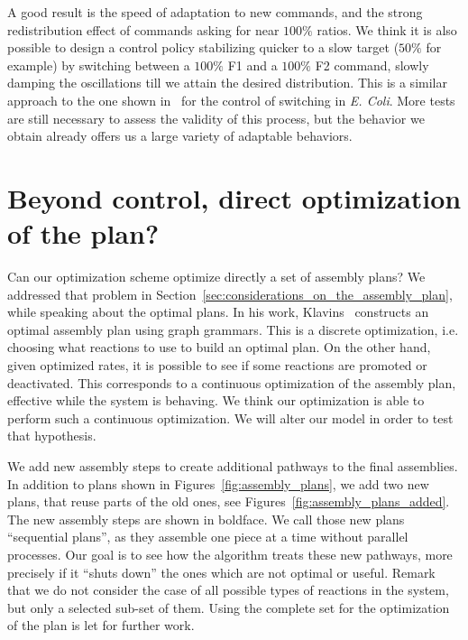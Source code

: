 	A good result is the speed of adaptation to new commands, and the strong redistribution effect of commands asking for near $100\%$ ratios. We think it is also possible to design a control policy stabilizing quicker to a slow target ($50\%$ for example) by switching between a $100\%$ F1 and a $100\%$ F2 command, slowly damping the oscillations till we attain the desired distribution. This is a similar approach to the one shown in~\cite{Julius:2007p4774, Julius:2008p4775} for the control of switching in \textit{E. Coli}. More tests are still necessary to assess the validity of this process, but the behavior we obtain already offers us a large variety of adaptable behaviors. 
	
	




\section{Beyond control, direct optimization of the plan?} %
\label{sec:beyond_control_direct_optimization_of_the_plan_}
	Can our optimization scheme optimize directly a set of assembly plans? We addressed that problem in Section~\ref{sec:considerations_on_the_assembly_plan}, while speaking about the optimal plans. In his work, Klavins~\cite{Klavins:2007p2600} constructs an optimal assembly plan using graph grammars. This is a discrete optimization, i.e. choosing what reactions to use to build an optimal plan. On the other hand, given optimized rates, it is possible to see if some reactions are promoted or deactivated. This corresponds to a continuous optimization of the assembly plan, effective while the system is behaving. We think our optimization is able to perform such a continuous optimization. We will alter our model in order to test that hypothesis.
	
	We add new assembly steps to create additional pathways to the final assemblies. In addition to plans shown in Figures~\ref{fig:assembly_plans}, we add two new plans, that reuse parts of the old ones, see Figures~\ref{fig:assembly_plans_added}. The new assembly steps are shown in boldface. We call those new plans ``sequential plans'', as they assemble one piece at a time without parallel processes. Our goal is to see how the algorithm treats these new pathways, more precisely if it ``shuts down'' the ones which are not optimal or useful. Remark that we do not consider the case of all possible types of reactions in the system, but only a selected sub-set of them. Using the complete set for the optimization of the plan is let for further work.
	
